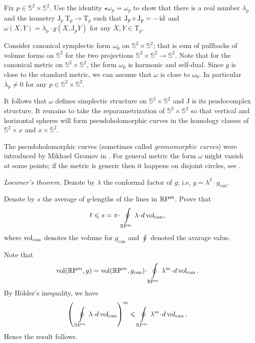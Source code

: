 Fix $p\in \mathbb{S}^2\times\mathbb{S}^2$.
Use the identity $\star\omega_p=\omega_p$
to show that
there is a real number $\lambda_p$ and the isometry $\mathrm{J}_p\:\mathrm{T}_p\to\mathrm{T}_p$ 
such that
$\mathrm{J}_p\circ\mathrm{J}_p =-\operatorname{\rm id}$ 
and 
$\omega(X,Y)=\lambda_p\cdot g(X,\mathrm{J}_pY)$ for any $X,Y\in \mathrm{T}_p$.

Consider canonical symplectic form $\omega_0$ on $\mathbb{S}^2\times\mathbb{S}^2$;
that is sum of pullbacks of volume forms on $\mathbb{S}^2$  
for the two projections $\mathbb{S}^2\times\mathbb{S}^2\to \mathbb{S}^2$.
Note that for the canonical metric on $\mathbb{S}^2\times\mathbb{S}^2$,
the form $\omega_0$ is harmonic and self-dual. 
Since $g$ is close to the standard metric,
we can assume that $\omega$ is close to $\omega_0$.
In particular $\lambda_p\ne0$ for any $p\in \mathbb{S}^2\times\mathbb{S}^2$.

It follows that $\omega$ defines simplectic structure on $\mathbb{S}^2\times\mathbb{S}^2$
and $\mathrm{J}$ is its psudocomplex structure.
It remains to take the reparametrization of $\mathbb{S}^2\times \mathbb{S}^2$
so that vertical and horizontal spheres will form pseudoholomorphic curves in the homology classes of $\mathbb{S}^2\times x$ and $x\times \mathbb{S}^2$.
 
 The pseudoholomorphic curves (sometimes called \emph{gromomorphic curves}) 
were introduced by Mikhael Gromov in \cite{gromov-pseudoholomorphic}.
For general metric the form $\omega$ might vanish at some points;
if the metric is generic then it happens on disjoint circles,
see \cite{honda}.





\textit{Loewner's theorem.}
Denote by $\lambda$ the conformal factor of $g$;
i.e, $g=\lambda^2\cdot g_{\mathrm{can}}$.

Denote by $s$ the average of $g$-lengths of the lines in $\mathbb{R}\mathrm{P}^m$.
Prove that 
\[\ell \le s=\pi\cdot\oint\limits_{\RP^m}\lambda\cdot d\vol_{\mathrm{can}},\]
where $\operatorname{\rm vol}_{\mathrm{can}}$ denotes the volume for $g_{\mathrm{can}}$ and $\oint$ denoted the avarage value.

Note that
\[\vol(\RP^m,g)
=
\vol(\RP^m,g_{\mathrm{can}})
\cdot
\oint\limits_{\RP^m}\lambda^m\cdot d\vol_{\mathrm{can}}.\]
By H\"older's inequality, we have
\[\left(\,\,\oint\limits_{\RP^m}\lambda\cdot d\vol_{\mathrm{can}}\right)^m
\le \oint\limits_{\RP^m}\lambda^m\cdot d\vol_{\mathrm{can}}.\]
Hence the result follows.

